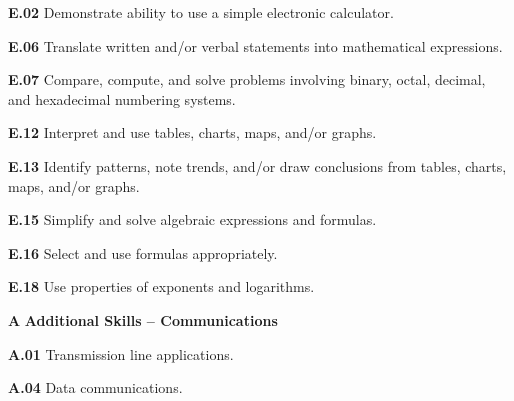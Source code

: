 \item{\bf E.02} Demonstrate ability to use a simple electronic calculator.
\item{\bf E.06} Translate written and/or verbal statements into mathematical expressions.
\item{\bf E.07} Compare, compute, and solve problems involving binary, octal, decimal, and hexadecimal numbering systems.
\item{\bf E.12} Interpret and use tables, charts, maps, and/or graphs.
\item{\bf E.13} Identify patterns, note trends, and/or draw conclusions from tables, charts, maps, and/or graphs.
\item{\bf E.15} Simplify and solve algebraic expressions and formulas.
\item{\bf E.16} Select and use formulas appropriately.
\item{\bf E.18} Use properties of exponents and logarithms.
\medskip

\vskip 5pt

\medskip
\item{\bf A} {\bf Additional Skills -- Communications}
\item{\bf A.01} Transmission line applications.
\item{\bf A.04} Data communications.
\medskip


